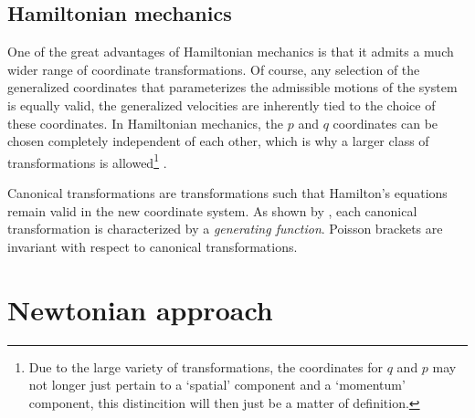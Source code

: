 \subsection{Hamiltonian mechanics}
One of the great advantages of Hamiltonian mechanics is that it admits a much wider range of coordinate transformations. Of course, any selection of the generalized coordinates that parameterizes the admissible motions of the system is equally valid, the generalized velocities are inherently tied to the choice of these coordinates. In Hamiltonian mechanics, the \(p\) and \(q\) coordinates can be chosen completely independent of each other, which is why a larger class of transformations is allowed\footnote{Due to the large variety of transformations, the coordinates for \(q\) and \(p\) may not longer just pertain to a `spatial' component and a `momentum' component, this distincition will then just be a matter of definition.} \cite{Landau1976}.

Canonical transformations are transformations such that Hamilton's equations remain valid in the new coordinate system. As shown by \citet{Landau1976}, each canonical transformation is characterized by a \emph{generating function}. Poisson brackets are invariant with respect to canonical transformations.


\section{Newtonian approach}
